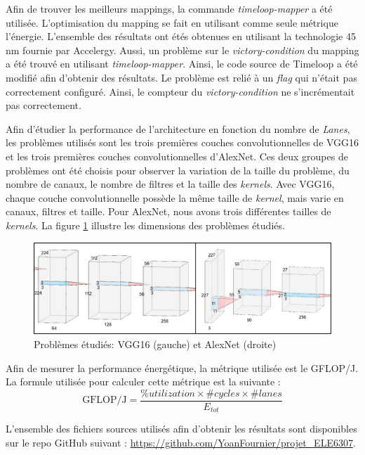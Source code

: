 \documentclass[11pt,letterpaper]{article}
\begin{document}
\begin{multicols}{2}
    Afin de trouver les meilleurs mappings, la commande \textit{timeloop-mapper} a été utilisée. 
    L'optimisation du mapping se fait en utilisant comme seule métrique l'énergie. L'ensemble des résultats
    ont étés obtenues en utilisant la technologie 45 nm fournie par Accelergy. Aussi, un problème sur le 
    \textit{victory-condition} du mapping a été trouvé en utilisant \textit{timeloop-mapper}. Ainsi, le code
    source de Timeloop a été modifié afin d'obtenir des résultats. Le problème est relié à un \textit{flag} 
    qui n'était pas correctement configuré. Ainsi, le compteur du \textit{victory-condition} ne s'incrémentait
    pas correctement.

    Afin d'étudier la performance de l'architecture en fonction du nombre de \textit{Lanes}, 
    les problèmes utilisés sont les trois premières couches convolutionnelles de VGG16 et 
    les trois premières couches convolutionnelles d'AlexNet. Ces deux groupes de problèmes 
    ont été choisis pour observer la variation de la taille du problème, du nombre de canaux, 
    le nombre de filtres et la taille des \textit{kernels}. Avec VGG16, chaque couche convolutionnelle 
    possède la même taille de \textit{kernel}, mais varie en canaux, filtres et taille. Pour 
    AlexNet, nous avons trois différentes tailles de \textit{kernels}. La figure \ref{fig:probs} 
    illustre les dimensions des problèmes étudiés.
    
    \begin{figure}[H]
        \centering
        \includegraphics[width=\linewidth]{probs.png}
        \caption{Problèmes étudiés: VGG16 (gauche) et AlexNet (droite)}
        \label{fig:probs}
    \end{figure}

    Afin de mesurer la performance énergétique, la métrique utilisée est le GFLOP/J. La 
    formule utilisée pour calculer cette métrique est la suivante :
    $$\text{GFLOP/J} = \frac{\%utilization \times \#cycles \times \#lanes}{E_{tot}}$$

    L'ensemble des fichiers sources utilisés afin d'obtenir les résultats sont disponibles
    sur le repo GitHub suivant : \url{https://github.com/YoanFournier/projet_ELE6307}.

    \end{multicols}
\end{document}
